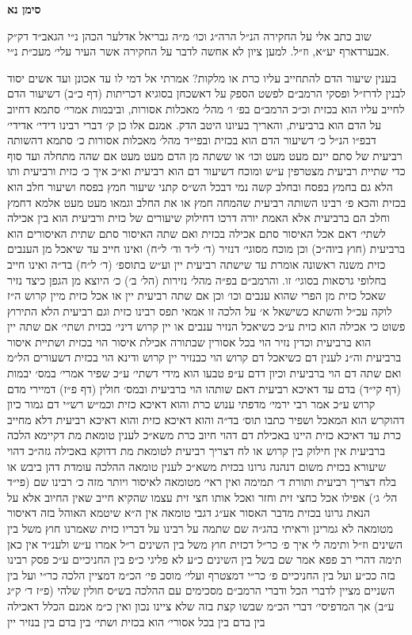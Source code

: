 \documentclass[12pt, openany]{book}
\newcommand{\chapname}{}
\newcommand{\newchap}[1]{
	\addcontentsline{toc}{chapter}{#1}
	\renewcommand{\chapname}{#1}
		\begin{center}
			\textbf{%
\fontsize{16pt}{16pt}\selectfont
				#1}
		\end{center}
}
\begin{document}
\newchap{סימן נא}
\begin{multicols}{2}
שוב כתב אלי על החקירה הנ״ל הרה״ג וכו׳ מ״ה גבריאל אדלער הכהן נ״י הגאב״ד דק״ק אבערדארף יע״א, וז״ל. למען ציון לא אחשה לדבר על החקירה אשר העיר עלי׳ מעכ״ת נ״י.\\\vspace{0pt}

בענין שיעור הדם להתחייב עליו כרת או מלקות? אמרתי אל דמי לו עד אכונן ועד אשים יסוד לבנין לדרז״ל ופסקי הרמב״ם לפשט הספק על דאשכחן בסוגיא דכריתות (דף כ״ב) דשיעור הדם לחייב עליו הוא בכזית וכ״כ הרמב״ם בפ׳ ו׳ מהל׳ מאכלות אסורות, וביבמות אמרי׳ סתמא דחיוב על הדם הוא ברביעית, והאריך בעיונו היטב הדק. אמנם אלו כן ק׳ דברי רבינו דידי׳ אדידי׳ דבפ״ו הנ״ל כ׳ דשיעור הדם הוא בכזית ובפי״ד מהל׳ מאכלות אסורות כ׳ סתמא דהשותה רביעית של סתם יינם מעט מעט וכו׳ או ששתה מן הדם מעט מעט אם שהה מתחלה ועד סוף כדי שתיית רביעית מצטרפין ע״ש ומוכח דשיעור דם הוא רביעית וא״כ איך כ׳ כזית ורביעית ותו הלא גם בחמץ בפסח ובחלב קשה נמי דבכל הש״ס קתני שיעור חמץ בפסח ושיעור חלב הוא בכזית והכא פ׳ רבינו השותה רביעית שהמחה חמץ או את החלב וגמאו מעט מעט אלמא דחמץ וחלב הם ברביעית אלא האמת יורה דרכו דחילוק שיעורים של כזית ורביעית הוא בין אכילה לשתי׳ דאם אכל האיסור סתם אכילה בכזית ואם שתה האיסור סתם שתית האיסורים הוא ברביעית (חוץ ביוה״כ) וכן מוכח מסוגי׳ דנזיר (ד׳ ל״ד וד׳ ל״ח) ואינו חייב עד שיאכל מן הענבים כזית משנה ראשונה אומרת עד שישתה רביעית יין וע״ש בתוספ׳ (ד׳ ל״ח) בד״ה ואינו חייב בחלופי גרסאות בסוגי׳ זו. והרמב״ם בפ״ה מהל׳ נזירות (הל׳ ב׳) כ׳ היוצא מן הגפן כיצד נזיר שאכל כזית מן הפרי שהוא ענבים וכו׳ וכן אם שתה רביעית יין או אכל כזית מיין קרוש ה״ז לוקה עכ״ל והשתא כשישאל א׳ על הלכה זו אמאי תפס רבינו כזית וגם רביעית הלא התירוץ פשוט כי אכילה הוא כזית ע״כ כשיאכל הנזיר ענבים או יין קרוש דיני׳ בכזית ושתי׳ אם שתה יין הוא ברביעית וכדין נזיר הוי בכל אסורין שבתורה אכילת איסור הוי בכזית ושתיית איסור ברביעית וה״נ לענין דם כשיאכל דם קרוש הוי כבנזיר יין קרוש ודינא הוי בכזית דשעורים הל״מ ואם שתה דם הוי ברביעית וכיון דדם ע״פ טבעו הוא מידי דשתי׳ ע״כ שפיר אמרי׳ במס׳ יבמות (דף קי״ד) בדם עד דאיכא רביעית דאם שותהו הוי ברביעית ובמס׳ חולין (דף פ״ז) דמיירי מדם קרוש ע״כ אמר רבי ירמי׳ מדפתי ענוש כרת והוא דאיכא כזית וכמ״ש רש״י דם גמור כיון דהוקרש הוא המאכל ושפיר כתבו תוס׳ בד״ה והוא דאיכא כזית והוא דאיכא רביעית דלא מחייב כרת עד דאיכא כזית היינו באכילת דם דהוי חיוב כרת משא״כ לענין טומאת מת דקיימא הלכה ברביעית אין חילוק בין קרוש או לח דצריך רביעית לטומאת מת דדוקא באכילה גזה״כ דהוי שיעורא בכזית משום דנהנה גרונו בכזית משא״כ לענין טומאה ההלכה עומדת דהן ביבש או בלח דצריך רביעית ותורת ד׳ תמימה ואין ראי׳ מטומאה לאיסור ויותר מזה כ׳ רבינו שם (פי״ד הל׳ ג׳) אפילו אכל כחצי זית וחזר ואכל אותו חצי זית עצמו שהקיא חייב שאין החיוב אלא על הנאת גרונו בכזית מדבר האסור אע״ג דגבי טומאה אין ה״א שיטמא האוהל בזה דאיסור מטומאה לא גמרינן וראיתי בהג״ה שם שתמה על רבינו על דבריו כזית שאמרנו חוץ משל בין השינים וז״ל ותימה לי איך פ׳ כר״ל דכזית חוץ משל בין השינים ר״ל אמרו ע״ש ולענ״ד אין כאן תימה דהרי רב פפא אמר שם בשל בין השינים כ״ע לא פליגי כ״פ בין החניכיים ע״כ פסק רבינו בזה ככ״ע ועל בין החניכיים פ׳ כר״י דמצטרף ועלי׳ מוסב פי׳ הכ״מ דמציין הלכה כר״י ועל בין השניים מציין לדברי הכל ודברי הרמב״ם מסכימים עם ההלכה בש״ס חולין שלהי (פ״ז ד׳ ק״ג ע״ב) אך המדפיסי׳ דברי הכ״מ שבשו קצת בזה שלא ציינו נכון ואין כ״מ אמנם הכלל דאכילה בין בדם בין בכל אסורי׳ הוא בכזית ושתי׳ בין בדם בין בנזיר יין 
\end{multicols}
\end{document}
